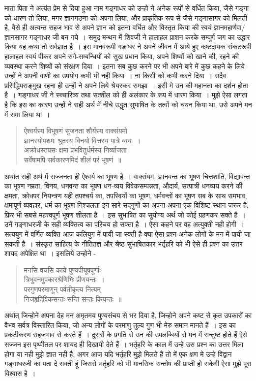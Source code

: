 {माता पिता ने अत्यंत प्रेम से दिया हुआ नाम गङ्गाधर को उन्हो ने अनेक रूपों से वर्धित किया, जैसे गङ्गा को धारण तो लिया, मगर ज्ञानगङगा को अपना लिया,  और प्राकृतिक रूप से जैसे गङ्गासागर को मिलती है, वैसे ही अत्यन्त सहज भाव से अपने ज्ञान को इतना वर्धित और विस्तृत किया की स्वयं ज्ञानमहार्णवा/ज्ञानसागर गङ्गाधर जी बन गये~। समुद्र मन्थन में शिवजी ने हालाहल प्राशन करके सम्पूर्ण जग का उद्धार किया यह कथा तो सर्वज्ञात है~। इस मानवरूपी गङाधर ने अपने जीवन में आये हुए कष्टदायक संकटरूपी हालाहल स्वयं पीकर अपने सगे-सम्बन्धियों को सुख प्रधान किया, अपने  शिष्यों को खाने की, रहने की व्यवस्था करने शिष्यों को संरक्षण दिया~। इतना सब कुछ करने पर भी अपने बारे में कुछ कहने के लिये उन्हों ने अपनी वाणी का उपयोग कभी भी नही किया~। ना किसी को कभी करने दिया~। सदैव प्रसिद्धिपराङ्मुख रहना ही उन्हों ने अपने लिये श्रेयस्कर समझा~। इसी मे  उन की महानता का दर्शन होता है~। गङ्गाधर जी ने स्च्चारित्र्य तथा सत्शील को ही अलंकार के रूप में धारण किया~। मुझे ऐसा लगता है कि इस का कारण उन्हों ने सही अर्थ में नीचे उद्धृत सुभाषित के तत्वों को चयन किया था, उसे अपने मन में समा लिया था~।
\begin{verse}
ऐश्वर्यस्य विभूषणं सुजनता शौर्यस्य वाक्संयमो \\
ज्ञानस्योपशमः श्रुतस्य विनयो वित्तस्य पात्रे व्ययः~।\\
अक्रोधस्तपसः क्षमा प्रभवितुर्धर्मस्य निर्व्याजता \\
सर्वेषामपि सर्वकारणमिदं शीलं परं भूषणं~॥
\end{verse}
अर्थात सही अर्थ में सज्जनता ही ऐश्वर्य का भूषण है~। वाक्संयम, ज्ञानवन्त का भूषण चित्तशांति, विद्यावन्त का भूषण नम्रता, विनय, धनवन्त का भूषण धन-व्यय विवेकसम्पन्नता, औदार्य, सत्पात्री धनव्यय करने की क्षमता, क्रोधपर नियन्त्रण यही तपश्चर्य का, तपस्वियों का भूषण, धर्मवन्तों का भूषण सब के साथ समभाव, क्षमापूर्ण व्यवहार, धर्म का भूषण निश्चलता इन सारे सद्गुणों का अपना-अपना एक विशिष्ट स्थान जरूर है, फ़िर भी सबसे महत्त्वपूर्ण भूषण शीलता है~। इस सुभाषित का सुयोग्य अर्थ जो कोई ग्रहणकर सक्ते है~। उनें गङ्गाधरजी के सही व्यक्तित्व का परिचय हो सक्ता है~। ऐसा कहने पर वह अत्युक्ती नही होगी~। सत्ययुग में वर्णित व्यक्ति आज कलियुग में पायी जा स्क्ती है क्या ऐसा प्रश्न अनेक लोगों के मन में पायी जा सकती है~। संस्कृत साहित्य के नीतितज्ञ और श्रेष्ठ सुभाषितकार भर्तृहरि को भी ऐसे ही प्रश्न का उत्तर शायद अपेक्षित था~। इसलिये उन्होने -
\begin{verse}
मनसि वचसि काये पुण्यपीयूषपूर्णाः \\
त्रिभुवनमुपकारश्रेणिभिः प्रीणयन्तः~।\\
परगुणपरमाणून् पर्वतीकृत्य नित्यम्\\
निजहृदिविकसन्तः सन्ति सन्तः कियन्तः~॥
\end{verse}
अर्थात् जिन्होने अपना देह मन अमृतमय पुण्यसंचय से भर दिया है, जिन्होने अपने कष्ट से कृत उपकारों का वैभव सर्वत्र विस्तारित किया, जो अन्य लोगों के परमाणु तुल्य गुण भी मेरु समान मानते हैं~। इस का प्रकटीकरण सहजभाव से करते हैं~। दुसरों के प्रगति से उन की उपलब्धियों से मन में सन्तुष्ट होते हैं ऐसे सज्जन इस पृथ्वीतल पर शायद ही दिखायी देते हैं~।  भर्तृहरि के काल में उन्हे उस प्रश्न का उत्तर मिला होगा या नही मुझे ज्ञात नही है, अगर आज यदि भर्तृहरि मुझे मिलते हैं  तो में एक क्षण मे उन्हे विद्वान गङ्गाधरजी का पता दे सक्ती हूं जिससे भर्तृहरि को भी मानसिक सन्तोष की प्राप्ती हो सकेगी ऐसा मुझे पूरा विश्वास है~। 

}
